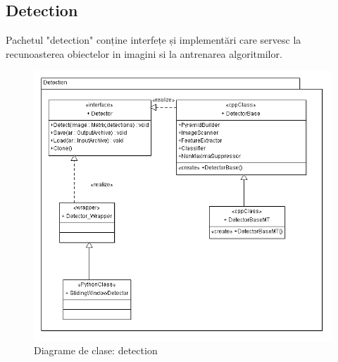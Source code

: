 \subsection{Detection}
Pachetul "detection" conține interfețe și implementări care servesc la recunoasterea obiectelor in imagini si la antrenarea algoritmilor.
\begin{figure}[h]
	\centering
		\includegraphics[width=1.00\textwidth]{uml/detectionClassDiagram.png}
	\caption{Diagrame de clase: detection}
	\label{fig:detectionClassDiagram}
\end{figure}
